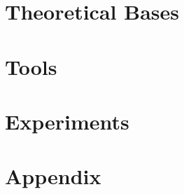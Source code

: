 \documentclass[a4paper,twoside,openright,titlepage,
               headinclude,footinclude,BCOR5mm,
               numbers=noenddot,cleardoublepage=empty,
               tablecaptionabove]{scrbook}
\begin{document}
	\frontmatter
%	
%	
%	
	
%	
	
	
	
	
	
		
	\tableofcontents
	
	\mainmatter
	\part{Theoretical Bases}
	\linenumbers
	
	
	
	\part{Tools}
	
	
	\part{Experiments}
	
	
	
	\appendix
	\part{Appendix}
	
	\backmatter
	
\end{document}
